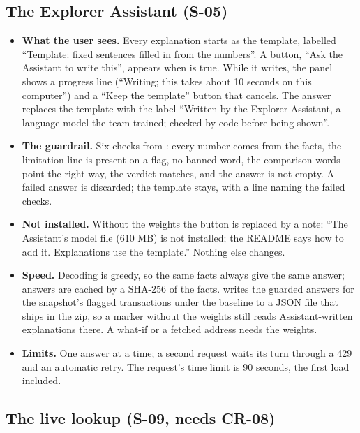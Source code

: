 \subsection{The Explorer Assistant (S-05)}
\label{sec:assistant}

\begin{itemize}
  \item \textbf{What the user sees.} Every explanation starts as the template, labelled ``Template:
    fixed sentences filled in from the numbers''. A button, ``Ask the Assistant to write this'',
    appears when  is true. While it writes, the panel shows a progress
    line (``Writing; this takes about 10 seconds on this computer'') and a ``Keep the template''
    button that cancels. The answer replaces the template with the label ``Written by the Explorer
    Assistant, a language model the team trained; checked by code before being shown''.
  \item \textbf{The guardrail.} Six checks from : every number comes
    from the facts, the limitation line is present on a flag, no banned word, the comparison words
    point the right way, the verdict matches, and the answer is not empty. A failed answer is
    discarded; the template stays, with a line naming the failed checks.
  \item \textbf{Not installed.} Without the weights the button is replaced by a note: ``The
    Assistant's model file (610 MB) is not installed; the README says how to add it. Explanations
    use the template.'' Nothing else changes.
  \item \textbf{Speed.} Decoding is greedy, so the same facts always give the same answer; answers
    are cached by a SHA-256 of the facts.  writes the guarded
    answers for the snapshot's flagged transactions under the baseline to a JSON file that ships in
    the zip, so a marker without the weights still reads Assistant-written explanations there. A
    what-if or a fetched address needs the weights.
  \item \textbf{Limits.} One answer at a time; a second request waits its turn through a 429 and an
    automatic retry. The request's time limit is 90 seconds, the first load included.
\end{itemize}

\subsection{The live lookup (S-09, needs CR-08)}
\label{sec:live}

